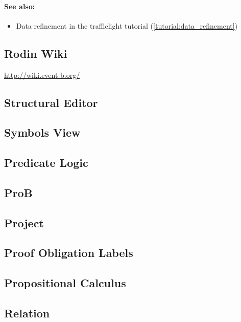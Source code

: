 \paragraph*{See also:}
\begin{itemize}
\item Data refinement in the trafficlight tutorial (\ref{tutorial:data_refinement})
\end{itemize}

\subsection{Rodin Wiki}
\label{rodin_wiki}

\url{http://wiki.event-b.org/}

\subsection{Structural Editor}
\label{structural_editor}

\subsection{Symbols View}
\label{symbols_view}

\subsection{Predicate Logic}
\label{predicate_logic}

\subsection{ProB}
\label{prob}

\subsection{Project}
\label{project}

\subsection{Proof Obligation Labels}
\label{po_labels}

\subsection{Propositional Calculus}
\label{propositional_calculus}

\subsection{Relation}
\label{relation}

